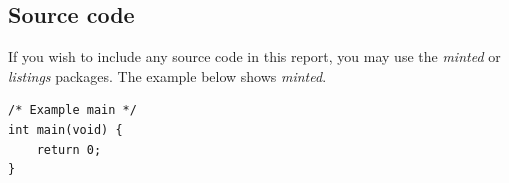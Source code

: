 \documentclass[10pt, titlepage, oneside, a4paper]{article}
\begin{document}
\printbibliography










\subsection{Source code}
\label{app:source-code}
If you wish to include any source code in this report, you may use the
\emph{minted} or \emph{listings} packages. The example below shows \emph{minted}.

\begin{verbatim}
/* Example main */
int main(void) {
    return 0;
}
\end{verbatim}
\end{document}
